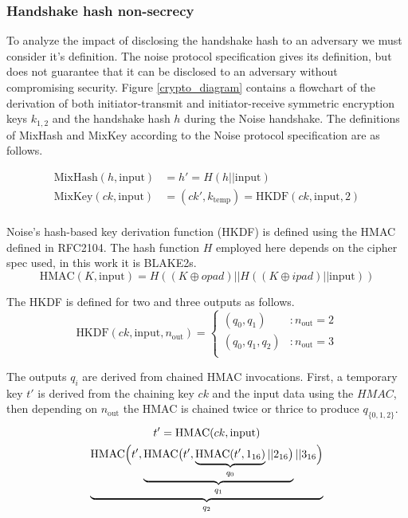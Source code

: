 \documentclass[12pt,a4paper,notitlepage]{article}
\begin{document}
\subsubsection{Handshake hash non-secrecy}

To analyze the impact of disclosing the handshake hash to an adversary we must consider it's definition. The noise
protocol specification gives its definition, but does not %
guarantee that it can be disclosed to an adversary without compromising security. Figure \ref{crypto_diagram} contains a
flowchart of the derivation of both initiator-transmit and initiator-receive symmetric encryption keys $k_{1,2}$ and the
handshake hash $h$ during the Noise handshake. The definitions of MixHash and MixKey according to the Noise protocol
specification are as follows.

\begin{align}
	\text{MixHash}(h,\text{input}) &= h' = H(h || \text{input})\\
	\text{MixKey}(ck, \text{input}) &= (ck', k_\text{temp}) = \text{HKDF}(ck, \text{input}, 2)\\
\end{align}

Noise's hash-based key derivation function (HKDF) is defined using the HMAC defined in RFC2104\cite{rfc2104}. The hash
function $H$ employed here depends on the cipher spec used, in this work it is BLAKE2s.
\begin{equation}
	\text{HMAC}(K, \text{input}) = H\left(\left(K \oplus opad\right)
		|| H\left(\left(K \oplus ipad\right) || \text{input} \right)\right)
\end{equation}

The HKDF is defined for two and three outputs as follows.
\begin{equation}
	\text{HKDF}(ck, \text{input}, n_\text{out}) =
		\left\{\begin{array}{ll}
			(q_0, q_1) &: n_\text{out} = 2\\
			(q_0, q_1, q_2) &: n_\text{out} = 3\\
		\end{array}\right.
\end{equation}

The outputs $q_i$ are derived from chained HMAC invocations. First, a temporary key $t'$ is derived from the chaining key $ck$
and the input data using the $HMAC$, then depending on $n_\text{out}$ the HMAC is chained twice or thrice to produce
$q_{\{0,1,2\}}$.
\begin{gather}
	t' = \text{HMAC}(ck, \text{input})\\
	\underbrace{\text{HMAC} \Bigl(t',
	\underbrace{\text{HMAC} \bigl(t',
	\underbrace{\text{HMAC} (t',
		   1_{16})}_{q_0}
		|| 2_{16}\bigr)}_{q_1}
		|| 3_{16}\Bigr)}_{q_2}
\end{gather}
\end{document}
